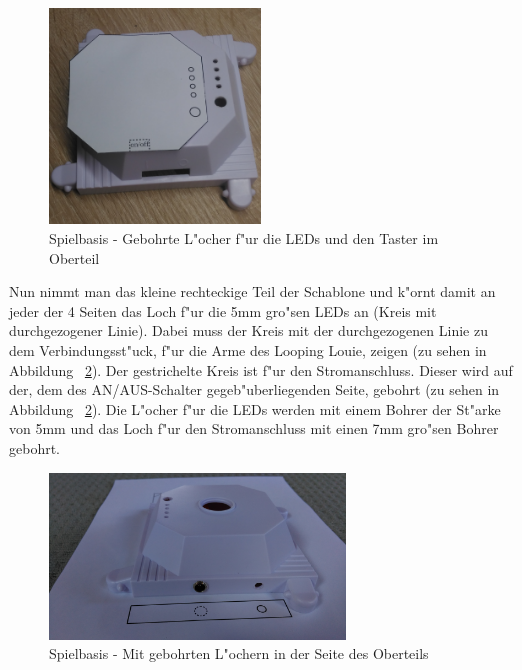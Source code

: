 \vspace{1cm}
\begin{figure}[!ht]
  	\includegraphics[width=0.5\textwidth]{pictures/loolou_013.jpg}
	\centering
	\caption{Spielbasis - Gebohrte L"ocher f"ur die LEDs und den Taster im Oberteil}
	\label{fig13}
\end{figure}
\vspace{0.5cm}
\newpage

Nun nimmt man das kleine rechteckige Teil der Schablone und k"ornt damit an jeder der 4 Seiten das Loch f"ur die 5mm gro"sen LEDs an (Kreis mit durchgezogener Linie). Dabei muss der Kreis mit der durchgezogenen Linie zu dem Verbindungsst"uck, f"ur die Arme des Looping Louie, zeigen (zu sehen in Abbildung ~\ref{fig14}). Der gestrichelte Kreis ist f"ur den Stromanschluss. Dieser wird auf der, dem des AN/AUS-Schalter gegeb"uberliegenden Seite, gebohrt (zu sehen in Abbildung ~\ref{fig14}). Die L"ocher f"ur die LEDs werden mit einem Bohrer der St"arke von 5mm und das Loch f"ur den Stromanschluss mit einen 7mm gro"sen Bohrer gebohrt.  

\vspace{1cm}
\begin{figure}[!ht]
	\centering
  	\includegraphics[width=0.7\textwidth]{pictures/loolou_014.jpg}
	\caption{Spielbasis - Mit gebohrten L"ochern in der Seite des Oberteils}
	\label{fig14}
\end{figure}
\vspace{0.5cm}

